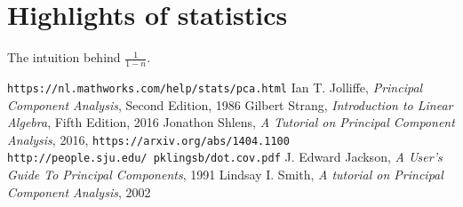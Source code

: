 \documentclass[10pt,twocolumn]{article}
\begin{document}
\section{Highlights of statistics} \label{app:B}

The intuition behind $\frac{1}{1-n}$.

\thebibliography{}

 \texttt{https://nl.mathworks.com/help/stats/pca.html}
 Ian T. Jolliffe, \textit{Principal Component Analysis}, Second Edition, 1986
 Gilbert Strang, \textit{Introduction to Linear Algebra}, Fifth Edition, 2016
 Jonathon Shlens, \textit{A Tutorial on Principal Component Analysis}, 2016, \texttt{https://arxiv.org/abs/1404.1100}
 \texttt{http://people.sju.edu/~pklingsb/dot.cov.pdf}
 J. Edward Jackson, \textit{A User's Guide To Principal Components}, 1991
 Lindsay I. Smith, \textit{A tutorial on Principal Component Analysis}, 2002
\end{document}
